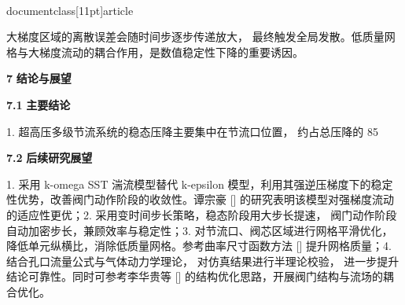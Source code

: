 \\documentclass[11pt]{article}
\begin{document}
\par
大梯度区域的离散误差会随时间步逐步传递放大， 最终触发全局发散。低质量网格与大梯度流动的耦合作用，是数值稳定性下降的重要诱因。\par

\par
\textbf{7    }\textbf{结论与展望}\par

\par
\textbf{7.1    }\textbf{主要结论}\par

1. 超高压多级节流系统的稳态压降主要集中在节流口位置， 约占总压降的 85\\%

\par
\textbf{7.2    }\textbf{后续研究展望}\par

1.  采用 k-omega SST 湍流模型替代 k-epsilon 模型，利用其强逆压梯度下的稳定性优势，改善阀门动作阶段的收敛性。谭宗豪 [\cite{fe880629_9ce4_4876_a173_e24a97d827f4_基于数字孪生的管道阀门监测技术研究_谭宗豪}]   的研究表明该模型对强梯度流动的适应性更优；2.  采用变时间步长策略，稳态阶段用大步长提速， 阀门动作阶段自动加密步长，兼顾效率与稳定性；3.  对节流口、阀芯区域进行网格平滑优化，降低单元纵横比，消除低质量网格。参考曲率尺寸函数方法 [\cite{fe880629_9ce4_4876_a173_e24a97d827f4_基于数字孪生的管道阀门监测技术研究_谭宗豪}]  提升网格质量；4.  结合孔口流量公式与气体动力学理论， 对仿真结果进行半理论校验， 进一步提升结论可靠性。同时可参考李华贵等 [\cite{fe880629_9ce4_4876_a173_e24a97d827f4_基于数字孪生的管道阀门监测技术研究_谭宗豪}]  的结构优化思路，开展阀门结构与流场的耦合优化。\par
\end{document}
